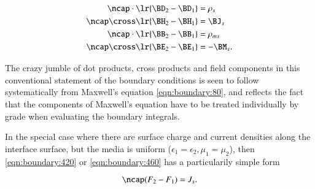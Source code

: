 %
%
\begin{dmath}\label{eqn:boundary:460}
\begin{aligned}
\ncap \cdot \lr{ \BD_2 - \BD_1 } &= \rho_s \\
\ncap \cross \lr{ \BH_2 - \BH_1 } &= \BJ_s \\
\ncap \cdot \lr{ \BB_2 - \BB_1 } &= \rho_{ms} \\
\ncap \cross \lr{ \BE_2 - \BE_1 } &= -\BM_s.
\end{aligned}
\end{dmath}

The crazy jumble of dot products, cross products and field components in this conventional statement of the boundary conditions is seen to follow systematically from Maxwell's equation \cref{eqn:boundary:80}, and reflects the fact that the components of Maxwell's equation have to be treated individually by grade when evaluating the boundary integrals.

In the special case where there are surface charge and current densities along the interface surface, but the media is uniform (\(\epsilon_1 = \epsilon_2, \mu_1 = \mu_2\)), then \cref{eqn:boundary:420} or \cref{eqn:boundary:460} has a particularily simple form \citep{chappell2014geometric}

\begin{dmath}\label{eqn:boundary:421}
\ncap (F_2 - F_1) = J_s.
\end{dmath}

